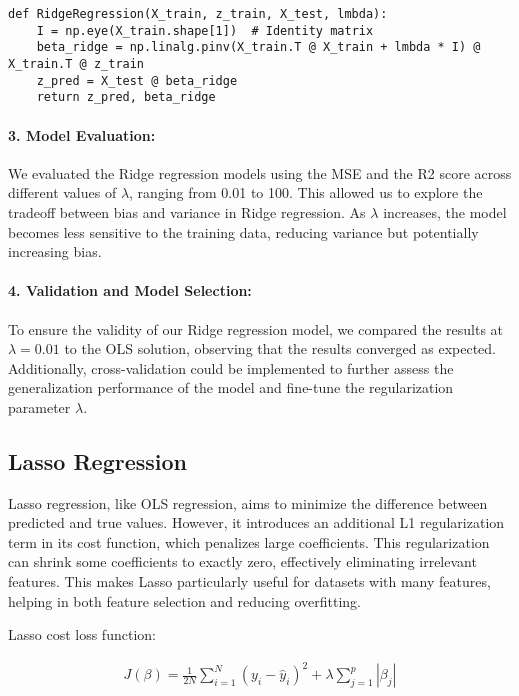 \documentclass{article}
\begin{document}
\begin{verbatim}
def RidgeRegression(X_train, z_train, X_test, lmbda):
    I = np.eye(X_train.shape[1])  # Identity matrix
    beta_ridge = np.linalg.pinv(X_train.T @ X_train + lmbda * I) @ X_train.T @ z_train
    z_pred = X_test @ beta_ridge
    return z_pred, beta_ridge
\end{verbatim}

\paragraph{3. Model Evaluation:}
We evaluated the Ridge regression models using the MSE and the R2 score across different values of \( \lambda \), ranging from 0.01 to 100. This allowed us to explore the tradeoff between bias and variance in Ridge regression. As \( \lambda \) increases, the model becomes less sensitive to the training data, reducing variance but potentially increasing bias.




\paragraph{4. Validation and Model Selection:}
To ensure the validity of our Ridge regression model, we compared the results at \( \lambda = 0.01 \) to the OLS solution, observing that the results converged as expected. Additionally, cross-validation could be implemented to further assess the generalization performance of the model and fine-tune the regularization parameter \( \lambda \).
\newline


\subsection{Lasso Regression}

Lasso regression, like OLS regression, aims to minimize the difference between predicted and true values. However, it introduces an additional L1 regularization term in its cost function, which penalizes large coefficients. This regularization can shrink some coefficients to exactly zero, effectively eliminating irrelevant features. This makes Lasso particularly useful for datasets with many features, helping in both feature selection and reducing overfitting.  
\newpage

Lasso cost loss function:
    
\begin{align*}
    J(\beta) = \frac{1}{2N} \sum_{i=1}^{N} \left( y_i - \hat{y}_i \right)^2 + \lambda \sum_{j=1}^{p} |\beta_j|\\
\end{align*}
\end{document}
